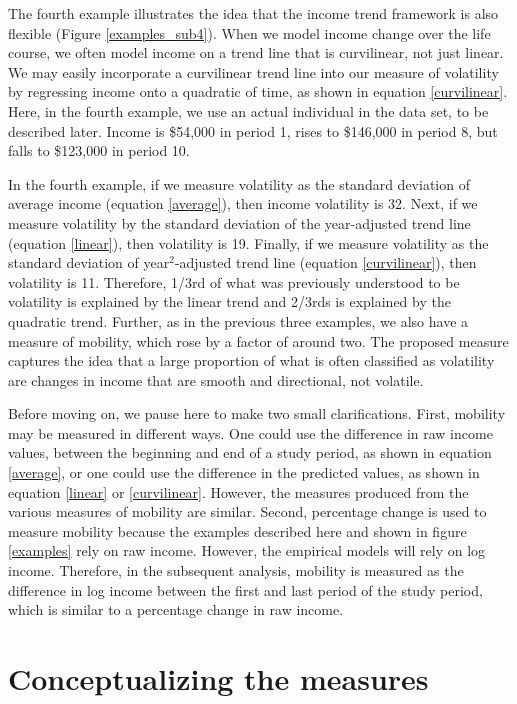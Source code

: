 \documentclass[12pt]{article}
\begin{document}
The fourth example illustrates the idea that the income trend framework is also flexible (Figure \ref{examples_sub4}). When we model income change over the life course, we often model income on a trend line that is curvilinear, not just linear. We may easily incorporate a curvilinear trend line into our measure of volatility by regressing income onto a quadratic of time, as shown in equation \ref{curvilinear}. Here, in the fourth example, we use an actual individual in the data set, to be described later. Income is \$54,000 in period 1, rises to \$146,000 in period 8, but falls to \$123,000 in period 10.

In the fourth example, if we measure volatility as the standard deviation of average income (equation \ref{average}), then income volatility is 32. Next, if we measure volatility by the standard deviation of the year-adjusted trend line (equation \ref{linear}), then volatility is 19. Finally, if we measure volatility as the standard deviation of year$^2$-adjusted trend line (equation \ref{curvilinear}), then volatility is 11. Therefore, 1/3rd of what was previously understood to be volatility is explained by the linear trend and 2/3rds is explained by the quadratic trend. Further, as in the previous three examples, we also have a measure of mobility, which rose by a factor of around two. The proposed measure captures the idea that a large proportion of what is often classified as volatility are changes in income that are smooth and directional, not volatile.

Before moving on, we pause here to make two small clarifications. First, mobility may be measured in different ways. One could use the difference in raw income values, between the beginning and end of a study period, as shown in equation \ref{average}, or one could use the difference in the predicted values, as shown in equation \ref{linear} or \ref{curvilinear}. However, the measures produced from the various measures of mobility are similar. Second, percentage change is used to measure mobility because the examples described here and shown in figure \ref{examples} rely on raw income. However, the empirical models will rely on log income. Therefore, in the subsequent analysis, mobility is measured as the difference in log income between the first and last period of the study period, which is similar to a percentage change in raw income.

\section{Conceptualizing the measures}
\end{document}
